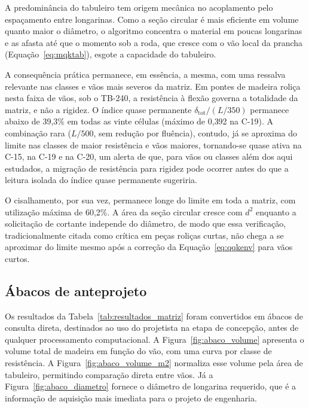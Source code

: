 A predominância do tabuleiro tem origem mecânica no acoplamento pelo espaçamento entre longarinas.
Como a seção circular é mais eficiente em volume quanto maior o diâmetro, o algoritmo concentra o material em poucas longarinas e as afasta até que o momento sob a roda, que cresce com o vão local da prancha (Equação~\eqref{eq:mqktab}), esgote a capacidade do tabuleiro.

A consequência prática permanece, em essência, a mesma, com uma ressalva relevante nas classes e vãos mais severos da matriz.
Em pontes de madeira roliça nesta faixa de vãos, sob o TB-240, a resistência à flexão governa a totalidade da matriz, e não a rigidez. O índice quase permanente $\delta_{\mathrm{tot}}/(L/350)$ permanece abaixo de 39{,}3\% em todas as vinte células (máximo de 0{,}392 na C-19).
A combinação rara ($L/500$, sem redução por fluência), contudo, já se aproxima do limite nas classes de maior resistência e vãos maiores, tornando-se quase ativa na C-15, na C-19 e na C-20, um alerta de que, para vãos ou classes além dos aqui estudados, a migração de resistência para rigidez pode ocorrer antes do que a leitura isolada do índice quase permanente sugeriria.

O cisalhamento, por sua vez, permanece longe do limite em toda a matriz, com utilização máxima de 60{,}2\%. A área da seção circular cresce com $d^2$ enquanto a solicitação de cortante independe do diâmetro, de modo que essa verificação, tradicionalmente citada como crítica em peças roliças curtas, não chega a se aproximar do limite mesmo após a correção da Equação~\eqref{eq:qqkenv} para vãos curtos.

\subsection{Ábacos de anteprojeto}\label{sec:abacos}

Os resultados da Tabela~\ref{tab:resultados_matriz} foram convertidos em ábacos de consulta direta, destinados ao uso do projetista na etapa de concepção, antes de qualquer processamento computacional.
A Figura~\ref{fig:abaco_volume} apresenta o volume total de madeira em função do vão, com uma curva por classe de resistência. A Figura~\ref{fig:abaco_volume_m2} normaliza esse volume pela área de tabuleiro, permitindo comparação direta entre vãos. Já a Figura~\ref{fig:abaco_diametro} fornece o diâmetro de longarina requerido, que é a informação de aquisição mais imediata para o projeto de engenharia.

